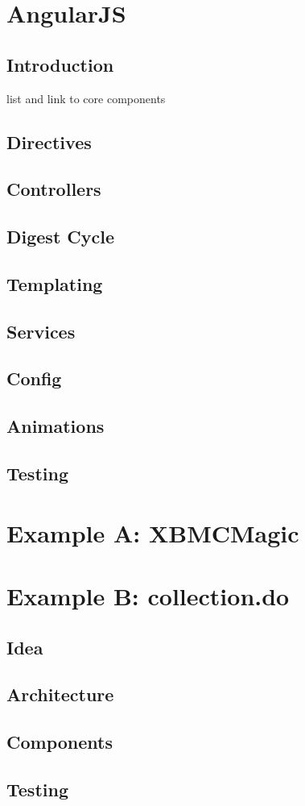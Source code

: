 

\chapter{AngularJS}
\section{Introduction}

list and link to core components

\section{Directives}
\section{Controllers}
\section{Digest Cycle}
\section{Templating}
\section{Services}
\section{Config}
\section{Animations}
\section{Testing}

\chapter{Example A: XBMCMagic}
\label{ch:xbmc}






\chapter{Example B: collection.do}
\label{ch:collection}

\section{Idea}
\section{Architecture}
\section{Components}
\section{Testing}